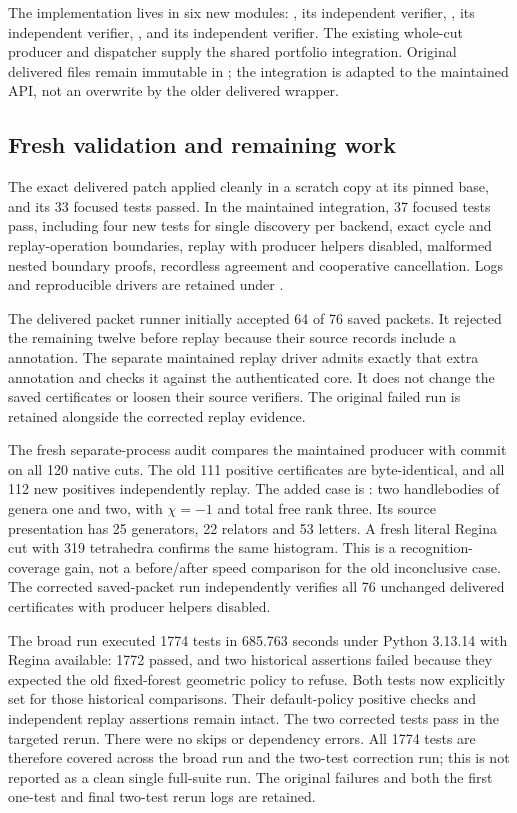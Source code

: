The implementation lives in six new modules:
, its independent verifier,
, its independent verifier,
, and its independent verifier.
The existing whole-cut producer and dispatcher supply the shared
portfolio integration.  Original delivered files remain immutable in
; the integration is adapted to the maintained API,
not an overwrite by the older delivered wrapper.

\subsection{Fresh validation and remaining work}

The exact delivered patch applied cleanly in a scratch copy at its pinned
base, and its 33 focused tests passed.  In the maintained integration,
37 focused tests pass, including four new tests for single discovery per
backend, exact cycle and replay-operation boundaries, replay with
producer helpers disabled, malformed nested boundary proofs, recordless
agreement and cooperative cancellation.  Logs and reproducible drivers
are retained under .

The delivered packet runner initially accepted 64 of 76 saved packets.
It rejected the remaining twelve before replay because their source
records include a  annotation.  The separate
maintained replay driver admits exactly that extra annotation and checks
it against the authenticated core.  It does not change the saved
certificates or loosen their source verifiers.  The original failed run
is retained alongside the corrected replay evidence.

The fresh separate-process audit compares the maintained producer with
commit  on all 120 native cuts.  The old 111 positive
certificates are byte-identical, and all 112 new positives independently
replay.  The added case is : two handlebodies
of genera one and two, with $\chi=-1$ and total free rank three.  Its source
presentation has 25 generators, 22 relators and 53 letters.  A fresh literal
Regina cut with 319 tetrahedra confirms the same histogram.  This is a
recognition-coverage gain, not a before/after speed comparison for the old
inconclusive case.  The corrected saved-packet run independently verifies
all 76 unchanged delivered certificates with producer helpers disabled.

The broad run executed 1774 tests in 685.763 seconds under Python 3.13.14
with Regina available: 1772 passed, and two historical assertions failed
because they expected the old fixed-forest geometric policy to refuse.
Both tests now explicitly set  for those
historical comparisons.  Their default-policy positive checks and
independent replay assertions remain intact.  The two corrected tests
pass in the targeted rerun.  There were no skips or dependency errors.
All 1774 tests are therefore covered across the broad run and the two-test
correction run; this is not reported as a clean single full-suite run.
The original failures and both the first one-test and final two-test
rerun logs are retained.

